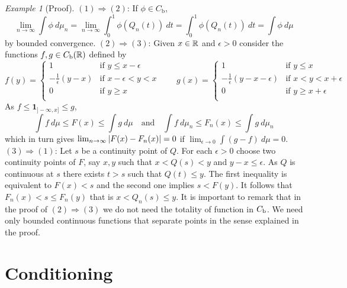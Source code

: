 \documentclass[12pt,a4paper]{amsart}
\newcommand{\one}{\bm 1}
\theoremstyle{plain}%
\theoremstyle{definition}
\theoremstyle{remark}
\newtheorem{example}{Example}
\begin{document}
\begin{example}[Proof]
$(1) \Rightarrow (2)$: If $\phi \in C_{\text{b}}$,
\begin{equation*}
  \lim_{n \to \infty} \int \phi \ d\mu_n = \lim_{n\to\infty} \int_0^1 \phi(Q_n(t)) \ dt = \int_0^1 \phi(Q_n(t)) \ dt = \int \phi \ d\mu
\end{equation*}
by bounded convergence. $(2) \Rightarrow (3)$: Given $x \in \mathbb{R}$ and  $\epsilon > 0$ consider the functions $f,g \in C_{\text{b}}(\mathbb{R})$ defined by
\begin{equation*}
  f(y) =
  \begin{cases}
  1 & \text{if $y \leq x-\epsilon$} \\
  - \frac1\epsilon(y - x) & \text{if $x - \epsilon < y < x$} \\
  0 & \text{if $y \geq x$} \\
  \end{cases}
 \qquad g(x) =
 \begin{cases}
  1 & \text{if $y \leq x$} \\
  - \frac1\epsilon (y - x - \epsilon) & \text{if $x < y < x + \epsilon$} \\
  0 & \text{if $y \geq x+\epsilon$} \\
  \end{cases}
\end{equation*}
As $f \leq \one_{]-\infty,x]} \leq g$,
\begin{equation*}
  \int f \ d\mu \leq F(x) \leq \int g \ d\mu  \quad \text{and} \quad   \int f \ d\mu_n \leq F_n(x) \leq \int g \ d\mu_n  
\end{equation*}
which in turn gives $\lim_{n \to \infty} \left\vert F(x) - F_n(x)\right\vert = 0$ if $\lim_{\epsilon\to 0} \int (g-f) \ d\mu = 0$. $(3) \Rightarrow (1)$: Let $s$ be a continuity point of $Q$. For each $\epsilon > 0$ choose two continuity points of $F$, say $x,y$ such that $x < Q(s) < y$ and $y - x \leq \epsilon$. As $Q$ is continuous at $s$ there exists $t > s$ such that $Q(t) \leq y$. The first inequality is equivalent to $F(x) < s$ and the second one implies $s < F(y)$. It follows that $F_n(x) < s \leq F_n(y)$ that is $x < Q_n(s) \leq y$. It is important to remark that in the proof of $(2) \Rightarrow (3)$ we do not need the totality of function in $C_{\text b}$. We need only bounded continuous functions that separate points in the sense explained in the proof. 
\end{example}

\section{Conditioning}
\label{sec:conditioning}
\end{document}
